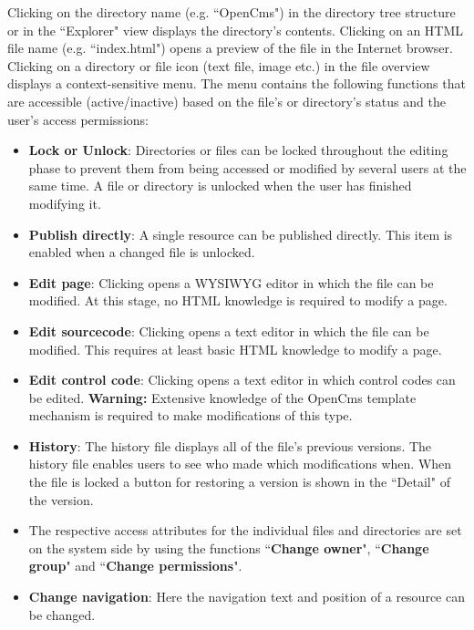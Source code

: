 Clicking on the directory name (e.g. ``OpenCms") in the directory
tree structure or in the ``Explorer" view displays the directory's
contents. Clicking on an HTML file name (e.g. ``index.html") opens
a preview of the file in the Internet browser. Clicking on a directory or file
icon (text file, image etc.) in the file overview displays a
context-sensitive menu. The menu contains the following functions
that are accessible (active/inactive) based on the file's or
directory's status and the user's access permissions:

\begin{itemize}
\item \textbf{Lock or Unlock}: Directories or files can be locked throughout
the editing phase to prevent them from being accessed or modified
by several users at the same time. A file or directory is unlocked
when the user has finished modifying it.

\item \textbf{Publish directly}: A single resource can be published
directly. This item is enabled when a changed file is unlocked.

\item \textbf{Edit page}: Clicking opens a WYSIWYG editor in which the file can be modified.
At this stage, no HTML knowledge is required to modify a page.

\item \textbf{Edit sourcecode}: Clicking opens a text editor in which the file can be modified.
This requires at least basic HTML knowledge to modify a page.

\item \textbf{Edit control code}: Clicking opens a text editor in which
control codes can be edited.
\textbf{Warning:} Extensive knowledge of the OpenCms template mechanism is required
to make modifications of this type.

\item \textbf{History}: The history file displays all of the file's previous
versions. The history file enables users to see who made which
modifications when. When the file is locked a button for restoring
a version is shown in the ``Detail" of the version.

\item The respective access
attributes for the individual files and directories are set on the
system side by using the functions ``\textbf{Change owner}", ``\textbf{Change group}"
and ``\textbf{Change permissions}".

\item \textbf{Change navigation}: Here the navigation text and position of a resource can be changed.


\end{itemize}
